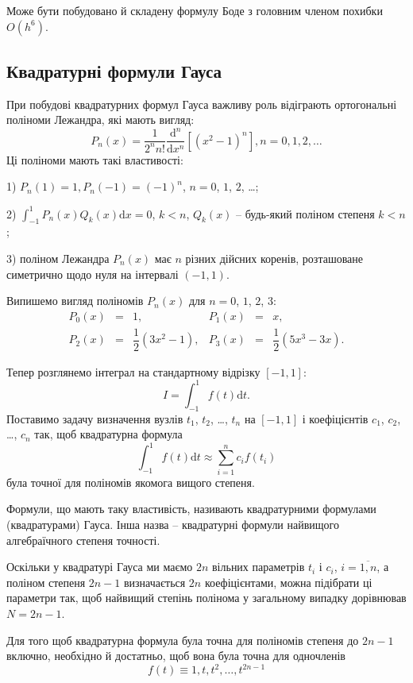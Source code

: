 \documentclass[14pt,twoside]{extreport}
\theoremstyle{mystyle}
\numberwithin{equation}{chapter}
\begin{document}
Може бути побудовано й складену формулу Боде з головним членом похибки $O(h^6)$.

\subsection{Квадратурні формули Гауса}

При побудові квадратурних формул Гауса важливу роль відіграють ортогональні поліноми Лежандра, які мають вигляд:
\[
P_{n}(x)=\frac{1}{2^{n}n!}\frac{\mathrm{d}^{n}}{\mathrm{d}x^{n}}[(x^{2}-1)^{n}], n=0, 1, 2, \ldots
\]
Ці поліноми мають такі властивості:

1) $P_{n}(1)=1, P_{n}(-1)=(-1)^{n}$, $n=0$, $1$, $2$, \ldots;

2) $\displaystyle \int_{-1}^{1}P_{n}(x)Q_{k}(x)\mathrm{d}x=0$, $k<n$, $Q_{k}(x)$ -- будь-який поліном степеня $k<n$;

3) поліном Лежандра $P_n(x)$ має $n$ різних дійсних коренів, розташоване симетрично щодо нуля на інтервалі $(-1, 1)$.

Випишемо вигляд поліномів $P_n(x)$ для $n = 0$, $1$, $2$, $3$:
\[
\begin{array}{llllll}
P_{0}(x) &=& 1, &P_{1}(x) &=& x,\\
P_{2}(x) &=& \dfrac{1}{2}(3x^{2}-1), &P_{3}(x) &=& \dfrac{1}{2}(5x^{3}-3x) .
\end{array}
\] 

Тепер розглянемо інтеграл на стандартному відрізку $[-1, 1]$:
\[
I=\int_{-1}^{1}f(t)\mathrm{d}t.
\]
Поставимо задачу визначення вузлів $t_1$, $t_2$, \ldots, $t_n$ на $[-1, 1]$ і коефіцієнтів $c_1$, $c_2$, \ldots, $c_n$ так, щоб квадратурна формула
\[
\int_{-1}^{1}f(t)\mathrm{d}t\approx\sum_{i=1}^{n}c_{i}f(t_{i})
\]
була точної для поліномів якомога вищого степеня.

Формули, що мають таку властивість, називають квадратурними формулами (квадратурами) Гауса. Інша назва -- квадратурні формули найвищого алгебраїчного степеня точності.

Оскільки у квадратурі Гауса ми маємо $2n$ вільних параметрів $t_i$ і $c_i$, $i = \overline{1, n}$, а поліном степеня $2n - 1$ визначається $2n$ коефіцієнтами, можна підібрати ці параметри так, щоб найвищий степінь полінома у загальному випадку дорівнював $N = 2n - 1$.

Для того щоб квадратурна формула була точна для поліномів степеня до $2n - 1$ включно, необхідно й достатньо, щоб вона була точна для одночленів
\[
f(t)\equiv 1, t, t^{2}, \ldots, t^{2n-1}
\]
\end{document}
